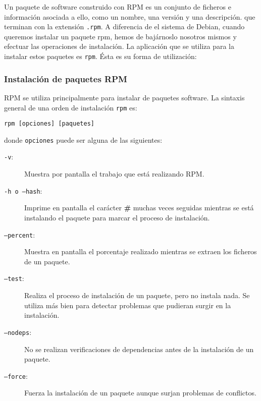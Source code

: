 Un paquete de software construido con RPM es un conjunto de ficheros e
información  asociada  a ello,  como  un  nombre,  una versión  y  una
descripción. que terminan con la extensión {\tt .rpm}. A diferencia de
el  sistema  de  Debian,  cuando queremos  instalar  un  paquete  rpm,
hemos  de bajárnoslo  nosotros mismos  y efectuar  las operaciones  de
instalación.  La aplicación  que  se utiliza  para  la instalar  estos
paquetes es {\tt rpm}. Ésta es su forma de utilización:

\subsubsection{Instalación de paquetes RPM}
RPM se utiliza  principalmente para instalar de  paquetes software. La
sintaxis general de una orden de instalación {\tt rpm} es:

\begin{verbatim}
rpm [opciones] [paquetes]
\end{verbatim}

\noindent donde {\tt opciones} puede ser alguna de las siguientes:
\begin{description}

\item [{\tt -v}:] Muestra por  pantalla el trabajo que está realizando
RPM.

\item [{\tt  -h o --hash}:] Imprime  en pantalla el carácter  {\bf \#}
muchas veces seguidas mientras se está instalando el paquete para marcar el proceso de instalación.

\item [{\tt  --percent}:] Muestra en pantalla  el porcentaje realizado
mientras se extraen los ficheros de un paquete.

\item [{\tt --test}:] Realiza el proceso de instalación de un paquete,
pero no instala nada. Se utiliza  más bien para detectar problemas que
pudieran surgir en la instalación.

\item [{\tt --nodeps}:] No  se realizan verificaciones de dependencias
antes de la instalación de un paquete.

\item  [{\tt --force}:]  Fuerza la  instalación de  un paquete  aunque
surjan problemas de conflictos.

\end{description}

